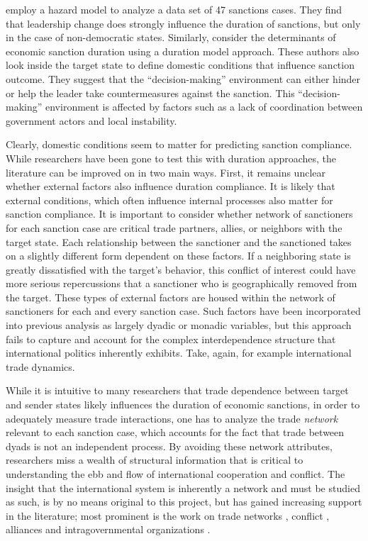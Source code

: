 \cite{mcgillivray2004} employ a hazard model to analyze a data set of 47 sanctions cases. They find that leadership change does strongly influence the duration of sanctions, but only in the case of non-democratic states. Similarly, \cite{bolks2000} consider the determinants of economic sanction duration using a duration model approach. These authors also look inside the target state to define domestic conditions that influence sanction outcome. They suggest that the ``decision-making'' environment can either hinder or help the leader take countermeasures against the sanction. This ``decision-making'' environment is affected by factors such as a lack of coordination between government actors and local instability. 

Clearly, domestic conditions seem to matter for predicting sanction compliance. While researchers have been gone to test this with duration approaches, the literature can be improved on in two main ways. First, it remains unclear whether external factors also influence duration compliance. It is likely that external conditions, which often influence internal processes also matter for sanction compliance. It is important to consider whether network of sanctioners for each sanction case are critical trade partners, allies, or neighbors with the target state. Each relationship between the sanctioner and the sanctioned takes on a slightly different form dependent on these factors. If a neighboring state is greatly dissatisfied with the target's behavior, this conflict of interest could have more serious repercussions that a sanctioner who is geographically removed from the target. These types of external factors are housed within the network of sanctioners for each and every sanction case. Such factors have been incorporated into previous analysis as largely dyadic or monadic variables, but this approach fails to capture and account for the complex interdependence structure that international politics inherently exhibits. Take, again, for example international trade dynamics. 

While it is intuitive to many researchers that trade dependence between target and sender states likely influences the duration of economic sanctions, in order to adequately measure trade interactions, one has to analyze the trade \textit{network} relevant to each sanction case, which accounts for the fact that trade between dyads is not an independent process. By avoiding these network attributes, researchers miss a wealth of structural information that is critical to understanding the ebb and flow of international cooperation and conflict. The insight that the international system is inherently a network and must be studied as such, is by no means original to this project, but has gained increasing support in the literature; most prominent is the work on trade networks \citep{hoff2004modeling} , conflict \citep{dorff2013}, alliances \citep{warren2010geometry} and intragovernmental organizations \citep{cao2009networks,greenhill2010norm}. 

